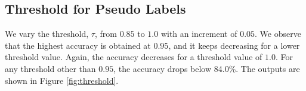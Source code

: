 \subsection{Threshold for Pseudo Labels}

We vary the threshold, $\tau$, from $0.85$ to $1.0$ with an increment of $0.05$. We observe that the highest accuracy is obtained at $0.95$, and it keeps decreasing for a lower threshold value. Again, the accuracy decreases for a threshold value of $1.0$. For any threshold other than $0.95$, the accuracy drops below 84.0\%. The outputs are shown in Figure \ref{fig:threshold}.

